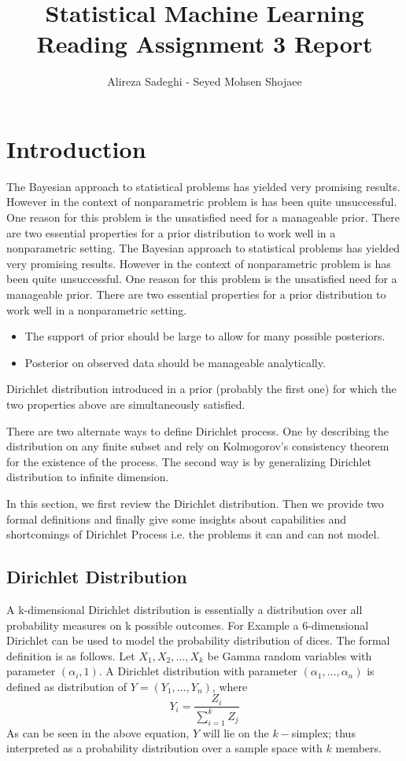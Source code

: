 \documentclass{article}
\title{Statistical Machine Learning \\ Reading Assignment 3 Report}
\author{Alireza Sadeghi - Seyed Mohsen Shojaee}
\begin{document}
\maketitle

\section{Introduction}
The Bayesian approach to statistical problems has yielded very promising results. However in the context
of nonparametric problem is has been quite unsuccessful. One reason for this problem is the unsatisfied need for a manageable prior.
There are two essential properties for a prior distribution to work well in a nonparametric setting.
The Bayesian approach to statistical problems has yielded very promising results. However in the context
of nonparametric problem is has been quite unsuccessful. One reason for this problem is the unsatisfied need for a manageable prior.
There are two essential properties for a prior distribution to work well in a nonparametric setting.
\begin{itemize}
  \item The support of prior should be large to allow for many possible posteriors.
\item Posterior on observed data should be manageable analytically.
\end{itemize}
Dirichlet distribution introduced in \cite{fegusen} a prior
(probably the first one) for which the two properties above are simultaneously satisfied.

There are two alternate ways to define Dirichlet process. One by
describing the distribution on any finite subset and rely on
Kolmogorov's consistency theorem for the existence of the process.
The second way is by generalizing Dirichlet distribution to infinite dimension.

In this section, we first review the Dirichlet distribution. Then we provide two formal definitions and finally
give some insights about capabilities and shortcomings of Dirichlet Process i.e. the problems it can and can not model.

\subsection{Dirichlet Distribution}
A k-dimensional Dirichlet distribution is essentially a distribution over all probability measures on k possible outcomes.
For Example a 6-dimensional Dirichlet can be used to model the probability distribution of dices.
The formal definition is as follows.
Let $X_1, X_2, \ldots, X_k$ be Gamma random variables with parameter $(\alpha_i, 1)$. A Dirichlet distribution with
parameter $(\alpha_1, \ldots, \alpha_n)$  is defined as distribution of $ Y = (Y_1, \ldots, Y_n)$, where
\begin{equation}
  Y_i = \frac{Z_i}{\sum_{i=1}^k Z_j}
\end{equation}
As can be seen in the above equation, $Y$ will lie on the $k-$simplex;
thus interpreted as a probability distribution over a sample space with $k$ members.
\end{document}
